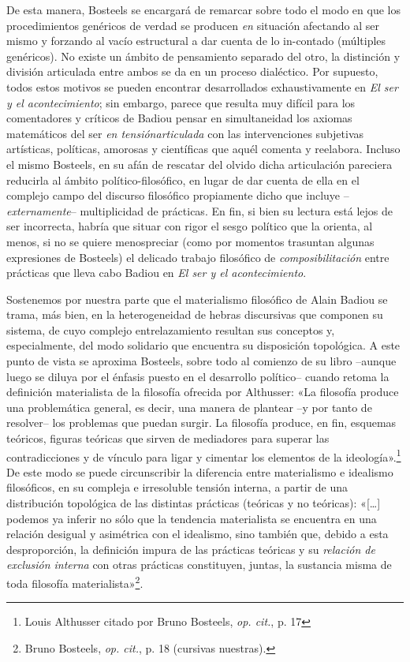 De esta manera, Bosteels se encargará de remarcar sobre todo el modo en que los procedimientos genéricos de verdad se producen \emph{en} situación afectando al ser mismo y forzando al vacío estructural a dar cuenta de lo in-contado (múltiples genéricos). No existe un ámbito de pensamiento separado del otro, la distinción y división articulada entre ambos se da en un proceso dialéctico. Por supuesto, todos estos motivos se pueden encontrar desarrollados exhaustivamente en \emph{El ser y el acontecimiento}; sin embargo, parece que resulta muy difícil para los comentadores y críticos de Badiou pensar en simultaneidad los axiomas matemáticos del ser \emph{en tensiónarticulada} con las intervenciones subjetivas artísticas, políticas, amorosas y científicas que aquél comenta y reelabora. Incluso el mismo Bosteels, en su afán de rescatar del olvido dicha articulación pareciera reducirla al ámbito político-filosófico, en lugar de dar cuenta de ella en el complejo campo del discurso filosófico propiamente dicho que incluye --\emph{externamente}-- multiplicidad de prácticas. En fin, si bien su lectura está lejos de ser incorrecta, habría que situar con rigor el sesgo político que la orienta, al menos, si no se quiere menospreciar (como por momentos trasuntan algunas expresiones de Bosteels) el delicado trabajo filosófico de \emph{composibilitación} entre prácticas que lleva cabo Badiou en \emph{El ser y el acontecimiento}.

Sostenemos por nuestra parte que el materialismo filosófico de Alain Badiou se trama, más bien, en la heterogeneidad de hebras discursivas que componen su sistema, de cuyo complejo entrelazamiento resultan sus conceptos y, especialmente, del modo solidario que encuentra su disposición topológica. A este punto de vista se aproxima Bosteels, sobre todo al comienzo de su libro --aunque luego se diluya por el énfasis puesto en el desarrollo político-- cuando retoma la definición materialista de la filosofía ofrecida por Althusser: «La filosofía produce una problemática general, es decir, una manera de plantear --y por tanto de resolver-- los problemas que puedan surgir. La filosofía produce, en fin, esquemas teóricos, figuras teóricas que sirven de mediadores para superar las contradicciones y de vínculo para ligar y cimentar los elementos de la ideología».\footnote{Louis Althusser citado por Bruno Bosteels, \emph{op. cit.}, p. 17} De este modo se puede circunscribir la diferencia entre materialismo e idealismo filosóficos, en su compleja e irresoluble tensión interna, a partir de una distribución topológica de las distintas prácticas (teóricas y no teóricas): «{[}\ldots{]} podemos ya inferir no sólo que la tendencia materialista se encuentra en una relación desigual y asimétrica con el idealismo, sino también que, debido a esta desproporción, la definición impura de las prácticas teóricas y su \emph{relación de exclusión interna} con otras prácticas constituyen, juntas, la sustancia misma de toda filosofía materialista»\footnote{Bruno Bosteels, \emph{op. cit.}, p. 18 (cursivas nuestras).}.

